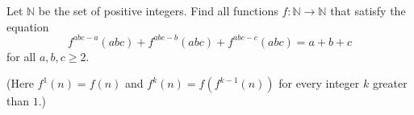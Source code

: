 Let $\mathbb N$ be the set of positive integers.  Find all functions $f: \mathbb N \to \mathbb N$ that satisfy the equation \[f^{abc-a}(abc) + f^{abc-b}(abc) + f^{abc-c}(abc) = a + b + c \] for all $a,b,c \ge 2$.

(Here $f^1(n) = f(n)$ and $f^k(n) = f(f^{k-1}(n))$ for every integer $k$ greater than $1$.)